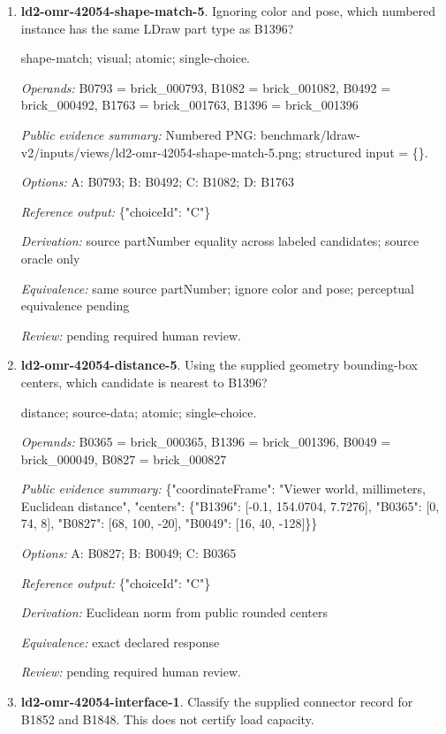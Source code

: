 \begin{enumerate}
\item \textbf{ld2-omr-42054-shape-match-5}. Ignoring color and pose, which numbered instance has the same LDraw part type as B1396?
\par{\small shape-match; visual; atomic; single-choice.\par\textit{Operands:} B0793 = brick\_000793, B1082 = brick\_001082, B0492 = brick\_000492, B1763 = brick\_001763, B1396 = brick\_001396\par\textit{Public evidence summary:} Numbered PNG: benchmark/ldraw-v2/inputs/views/ld2-omr-42054-shape-match-5.png; structured input = \{\}.\par\textit{Options:} A: B0793; B: B0492; C: B1082; D: B1763\par\textit{Reference output:} \{"choiceId": "C"\}\par\textit{Derivation:} source partNumber equality across labeled candidates; source oracle only\par\textit{Equivalence:} same source partNumber; ignore color and pose; perceptual equivalence pending\par\textit{Review:} pending required human review.}
\item \textbf{ld2-omr-42054-distance-5}. Using the supplied geometry bounding-box centers, which candidate is nearest to B1396?
\par{\small distance; source-data; atomic; single-choice.\par\textit{Operands:} B0365 = brick\_000365, B1396 = brick\_001396, B0049 = brick\_000049, B0827 = brick\_000827\par\textit{Public evidence summary:} \{"coordinateFrame": "Viewer world, millimeters, Euclidean distance", "centers": \{"B1396": [-0.1, 154.0704, 7.7276], "B0365": [0, 74, 8], "B0827": [68, 100, -20], "B0049": [16, 40, -128]\}\}\par\textit{Options:} A: B0827; B: B0049; C: B0365\par\textit{Reference output:} \{"choiceId": "C"\}\par\textit{Derivation:} Euclidean norm from public rounded centers\par\textit{Equivalence:} exact declared response\par\textit{Review:} pending required human review.}
\item \textbf{ld2-omr-42054-interface-1}. Classify the supplied connector record for B1852 and B1848. This does not certify load capacity.

\end{enumerate}
